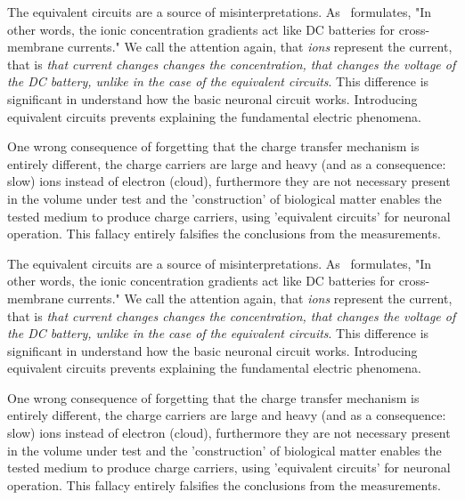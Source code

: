 \ifx\magyar\undefined
The equivalent circuits are a source of misinterpretations. As~\cite{JohnstonWuNeurophysiology:1995} formulates,
"In other words, the ionic concentration gradients act like DC batteries for cross-membrane currents."
We call the attention again, that \textit{ions} represent the current,
that is \textit{that current changes changes the concentration, that changes
the voltage of the DC battery, unlike in the case of the equivalent circuits}.
This difference is significant in understand how the basic neuronal circuit works.
Introducing equivalent circuits prevents explaining the fundamental 
electric phenomena.


%
One wrong consequence of forgetting that the charge transfer mechanism is entirely different,
the charge carriers are large and heavy (and as a consequence: slow) ions instead of electron (cloud),
furthermore they are not necessary present in the 
volume under test and the 'construction' of biological matter 
enables the tested medium to produce charge carriers,
using 'equivalent circuits' for
neuronal operation. This fallacy
entirely falsifies the conclusions from the measurements.

\else

The equivalent circuits are a source of misinterpretations. As~\cite{JohnstonWuNeurophysiology:1995} formulates,
"In other words, the ionic concentration gradients act like DC batteries for cross-membrane currents."
We call the attention again, that \textit{ions} represent the current,
that is \textit{that current changes changes the concentration, that changes
the voltage of the DC battery, unlike in the case of the equivalent circuits}.
This difference is significant in understand how the basic neuronal circuit works.
Introducing equivalent circuits prevents explaining the fundamental 
electric phenomena.


%
One wrong consequence of forgetting that the charge transfer mechanism is entirely different,
the charge carriers are large and heavy (and as a consequence: slow) ions instead of electron (cloud),
furthermore they are not necessary present in the 
volume under test and the 'construction' of biological matter 
enables the tested medium to produce charge carriers,
using 'equivalent circuits' for
neuronal operation. This fallacy
entirely falsifies the conclusions from the measurements.
\fi


